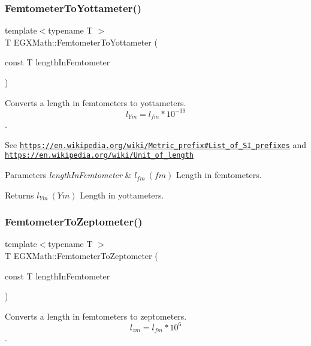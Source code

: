 \subsubsection{\texorpdfstring{Femtometer\+To\+Yottameter()}{FemtometerToYottameter()}}
{\footnotesize\ttfamily template$<$typename T $>$ \\
T E\+G\+X\+Math\+::\+Femtometer\+To\+Yottameter (\begin{DoxyParamCaption}\item[{const T}]{length\+In\+Femtometer }\end{DoxyParamCaption})}



Converts a length in femtometers to yottameters. \[ l_{Ym}=l_{fm} * 10^{-39} \]. 

See \href{https://en.wikipedia.org/wiki/Metric_prefix#List_of_SI_prefixes}{\tt https\+://en.\+wikipedia.\+org/wiki/\+Metric\+\_\+prefix\#\+List\+\_\+of\+\_\+\+S\+I\+\_\+prefixes} and \href{https://en.wikipedia.org/wiki/Unit_of_length}{\tt https\+://en.\+wikipedia.\+org/wiki/\+Unit\+\_\+of\+\_\+length} 
\begin{DoxyParams}{Parameters}
{\em length\+In\+Femtometer} & $ l_{fm}\ (fm)$ Length in femtometers. \\
\hline
\end{DoxyParams}
\begin{DoxyReturn}{Returns}
$ l_{Ym}\ (Ym)$ Length in yottameters. 
\end{DoxyReturn}
\mbox{\label{group___e_g_x_math-_conversions-_length_conversions-_s_i-_femtometer-_s_i_ga9bcc5cf611f6646652effc080ce29f1a}} 
\subsubsection{\texorpdfstring{Femtometer\+To\+Zeptometer()}{FemtometerToZeptometer()}}
{\footnotesize\ttfamily template$<$typename T $>$ \\
T E\+G\+X\+Math\+::\+Femtometer\+To\+Zeptometer (\begin{DoxyParamCaption}\item[{const T}]{length\+In\+Femtometer }\end{DoxyParamCaption})}



Converts a length in femtometers to zeptometers. \[ l_{zm}=l_{fm} * 10^{6} \]. 

